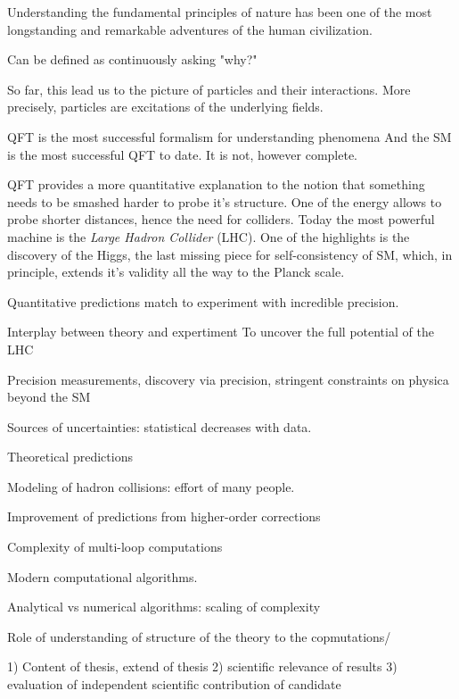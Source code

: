 Understanding the fundamental principles of nature has been one of the most longstanding and remarkable adventures of the human civilization.

Can be defined as continuously asking "why?" 

So far, this lead us to the picture of particles and their interactions.
More precisely, particles are excitations of the underlying fields.

QFT is the most successful formalism for understanding  phenomena
And the SM is the most successful QFT to date.
It is not, however complete.

QFT provides a more quantitative explanation to the notion that something needs to be smashed harder to probe it's structure.
One of the  energy allows to probe shorter distances, hence the need for colliders.
Today the most powerful machine is the \emph{Large Hadron Collider} (LHC).
One of the highlights is the discovery of the Higgs, the last missing piece for self-consistency of SM,
which, in principle, extends it's validity all the way to the Planck scale.



Quantitative predictions match to experiment with incredible precision.



Interplay between theory and expertiment
To uncover the full potential of the LHC

Precision measurements, discovery via precision,
stringent constraints on physica beyond the SM

Sources of uncertainties: statistical decreases with data.

Theoretical predictions 

Modeling of hadron collisions: effort of many people.

Improvement of predictions from higher-order corrections


Complexity of multi-loop computations

Modern computational algorithms.

Analytical vs numerical algorithms: scaling of complexity

Role of understanding of structure of the theory to the copmutations/






1) Content of thesis, extend of thesis
2) scientific relevance of results
3) evaluation of independent scientific contribution of candidate


